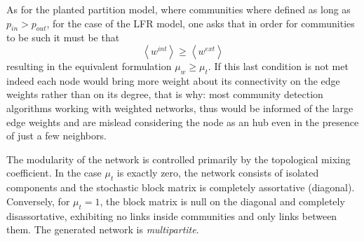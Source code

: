 As for the planted partition model, where communities where defined as long as $p_{in}>p_{out}$, for the case of the LFR model, one asks that in order for communities to be such it must be that
\begin{equation}
\left< w^{int} \right> \geq \left< w^{ext} \right>
\end{equation}
resulting in the equivalent formulation $\mu_w  \geq \mu_t$. If this last condition is not met indeed each node would bring more weight about its connectivity on the edge weights rather than on its degree, that is why: most community detection algorithms working with weighted networks, thus would be informed of the large edge weights and are mislead considering the node as an hub even in the presence of just a few neighbors.

The modularity of the network is controlled primarily by the topological mixing coefficient. In the case $\mu_t$ is exactly zero, the network consists of isolated components and the stochastic block matrix is completely assortative (diagonal). Conversely, for $\mu_t=1$, the block matrix is null on the diagonal and completely disassortative, exhibiting no links inside communities and only links between them. The generated network is \emph{multipartite}.

